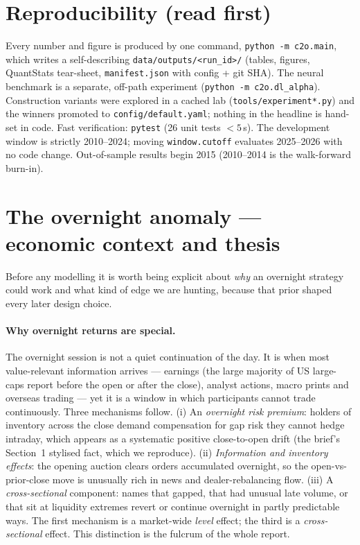 \documentclass[11pt,a4paper]{article}
\newcommand{\code}[1]{\texttt{#1}}
\begin{document}
\section*{Reproducibility (read first)}
Every number and figure is produced by one command, \code{python -m c2o.main}, which writes a self-describing
\code{data/outputs/<run\_id>/} (tables, figures, QuantStats tear-sheet, \code{manifest.json} with config + git
SHA). The neural benchmark is a separate, off-path experiment (\code{python -m c2o.dl\_alpha}). Construction
variants were explored in a cached lab (\code{tools/experiment*.py}) and the winners promoted to
\code{config/default.yaml}; nothing in the headline is hand-set in code. Fast verification: \code{pytest} (26
unit tests $<5$\,s). The development window is strictly 2010--2024; moving \code{window.cutoff} evaluates
2025--2026 with no code change. Out-of-sample results begin 2015 (2010--2014 is the walk-forward burn-in).

\section{The overnight anomaly --- economic context and thesis}
Before any modelling it is worth being explicit about \emph{why} an overnight strategy could work and what kind
of edge we are hunting, because that prior shaped every later design choice.

\paragraph{Why overnight returns are special.} The overnight session is not a quiet continuation of the day. It
is when most value-relevant information arrives --- earnings (the large majority of US large-caps report before
the open or after the close), analyst actions, macro prints and overseas trading --- yet it is a window in which
participants cannot trade continuously. Three mechanisms follow. (i) An \emph{overnight risk premium}: holders
of inventory across the close demand compensation for gap risk they cannot hedge intraday, which appears as a
systematic positive close-to-open drift (the brief's Section~1 stylised fact, which we reproduce). (ii)
\emph{Information and inventory effects}: the opening auction clears orders accumulated overnight, so the
open-vs-prior-close move is unusually rich in news and dealer-rebalancing flow. (iii) A \emph{cross-sectional}
component: names that gapped, that had unusual late volume, or that sit at liquidity extremes revert or continue
overnight in partly predictable ways. The first mechanism is a market-wide \emph{level} effect; the third is a
\emph{cross-sectional} effect. This distinction is the fulcrum of the whole report.
\end{document}
